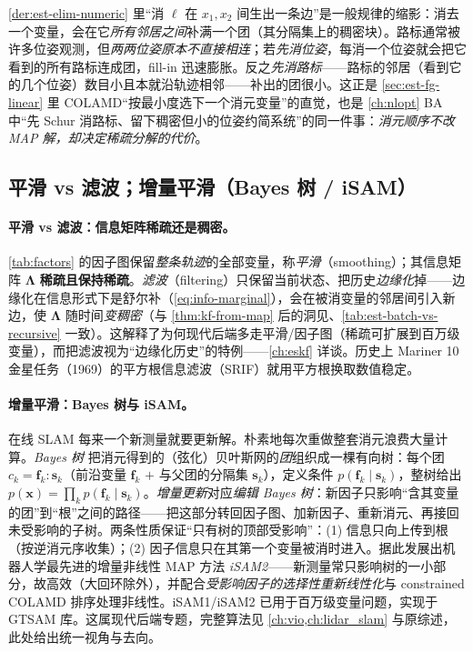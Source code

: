 \begin{insight}
\cref{der:est-elim-numeric} 里“消 $\ell$ 在 $x_1,x_2$ 间生出一条边”是一般规律的缩影：消去一个变量，会在它\emph{所有邻居之间}补满一个团（其分隔集上的稠密块）。路标通常被许多位姿观测，但\emph{两两位姿原本不直接相连}；若\emph{先消位姿}，每消一个位姿就会把它看到的所有路标连成团，fill-in 迅速膨胀。反之\emph{先消路标}——路标的邻居（看到它的几个位姿）数目小且本就沿轨迹相邻——补出的团很小。这正是 \cref{sec:est-fg-linear} 里 COLAMD“按最小度选下一个消元变量”的直觉，也是 \cref{ch:nlopt} BA 中“先 Schur 消路标、留下稠密但小的位姿约简系统”的同一件事：\emph{消元顺序不改 MAP 解，却决定稀疏分解的代价}。
\end{insight}

\subsection{平滑 vs 滤波；增量平滑（Bayes 树 / iSAM）}
\label{sec:est-smooth-filter}

\paragraph{平滑 vs 滤波：信息矩阵稀疏还是稠密。}
\cref{tab:factors} 的因子图保留\emph{整条轨迹}的全部变量，称\emph{平滑}（smoothing）；其信息矩阵 $\boldsymbol{\Lambda}$ \textbf{稀疏且保持稀疏}。\emph{滤波}（filtering）只保留当前状态、把历史\emph{边缘化}掉——边缘化在信息形式下是舒尔补（\cref{eq:info-marginal}），会在被消变量的邻居间引入新边，使 $\boldsymbol{\Lambda}$ 随时间\emph{变稠密}\cite{carlone2026handbook}（与 \cref{thm:kf-from-map} 后的洞见、\cref{tab:est-batch-vs-recursive} 一致）。这解释了为何现代后端多走平滑/因子图（稀疏可扩展到百万级变量），而把滤波视为“边缘化历史”的特例——\cref{ch:eskf} 详谈。历史上 Mariner 10 金星任务（1969）的平方根信息滤波（SRIF）就用平方根换取数值稳定\cite{carlone2026handbook}。

\paragraph{增量平滑：Bayes 树与 iSAM。}
在线 SLAM 每来一个新测量就要更新解。朴素地每次重做整套消元浪费大量计算。\emph{Bayes 树}\cite{carlone2026handbook} 把消元得到的（弦化）贝叶斯网的\emph{团}组织成一棵有向树：每个团 $c_k=\mathbf{f}_k:\mathbf{s}_k$（前沿变量 $\mathbf{f}_k$ $+$ 与父团的分隔集 $\mathbf{s}_k$），定义条件 $p(\mathbf{f}_k\mid\mathbf{s}_k)$，整树给出 $p(\mathbf{x})=\prod_k p(\mathbf{f}_k\mid\mathbf{s}_k)$。\emph{增量更新}对应\emph{编辑 Bayes 树}：新因子只影响“含其变量的团”到“根”之间的路径——把这部分转回因子图、加新因子、重新消元、再接回未受影响的子树。两条性质保证“只有树的顶部受影响”：(1) 信息只向上传到根（按逆消元序收集）；(2) 因子信息只在其第一个变量被消时进入。据此发展出机器人学最先进的增量非线性 MAP 方法 \emph{iSAM2}\cite{carlone2026handbook}——新测量常只影响树的一小部分，故高效（大回环除外），并配合\emph{受影响因子的选择性重新线性化}与 constrained COLAMD 排序处理非线性。iSAM1/iSAM2 已用于百万级变量问题，实现于 GTSAM 库。这属现代后端专题，完整算法见 \cref{ch:vio,ch:lidar_slam} 与原综述\cite{dellaert2017factor}，此处给出统一视角与去向。

